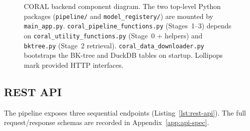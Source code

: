 \begin{figure}[H]
{}
    \caption[CORAL backend component diagram]{CORAL backend component diagram. The two top-level Python packages (\texttt{pipeline/} and \texttt{model\_registery/}) are mounted by \texttt{main\_app.py}. \texttt{coral\_pipeline\_functions.py} (Stages~1--3) depends on \texttt{coral\_utility\_functions.py} (Stage~0 + helpers) and \texttt{bktree.py} (Stage~2 retrieval). \texttt{coral\_data\_downloader.py} bootstraps the BK-tree and DuckDB tables on startup. Lollipops mark provided HTTP interfaces.}
    \label{fig:components-diagram}
\end{figure}

\clearpage

\subsection{REST API}
\label{ssec:rest-api}

The pipeline exposes three sequential endpoints (Listing~\ref{lst:rest-api}). The full request/response schemas are recorded in Appendix~\ref{app:api-spec}.

